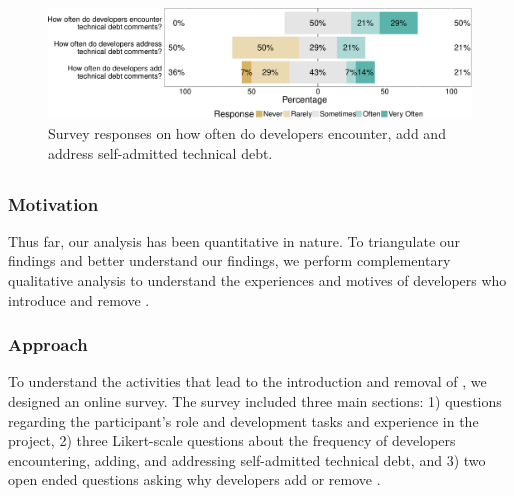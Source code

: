 \begin{figure}[!tb]
	\centering
	\includegraphics[width=\columnwidth]{figures/test/responses_question.pdf}
	\caption{Survey responses on how often do developers encounter, add and address self-admitted technical debt.}
	\label{fig:encouner_add_address}
\end{figure}




\subsection*{\rqiv}

\subsubsection*{Motivation} 
Thus far, our analysis has been quantitative in nature. To triangulate our findings and better understand our findings, we perform complementary qualitative analysis to understand the experiences and motives of developers who introduce and remove \SATD.


 
\subsubsection*{Approach} 
To understand the activities that lead to the introduction and removal of \SATD, we designed an online survey. The survey included three main sections: 1)  questions regarding the participant's role and development tasks and experience in the project, 2) three Likert-scale questions about the frequency of developers encountering, adding, and addressing self-admitted technical debt, and 3) two open ended questions asking why developers add or remove \SATD. 

